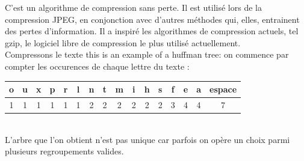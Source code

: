 \documentclass[a4paper,12pt,french]{book}
\begin{document}
	C'est un algorithme de compression sans perte. 
	Il est utilisé lors de la compression JPEG, en conjonction avec d'autres méthodes qui, elles, entrainent des pertes d'information.
	Il a inspiré les algorithmes de compression actuels, tel gzip, le logiciel libre de compression le plus utilisé actuellement.\\
	
	Compressons le texte \og this is an example of a huffman tree\fg : 
	on commence par compter les occurences de chaque lettre du texte :
	\begin{center}
	\begin{tabular}{|c|c|c|c|c|c|c|c|c|c|c|c|c|c|c|c|}
	\hline 
	o & u & x & p & r & l & n & t & m & i & h & s & f & e & a & espace \\ 
	\hline 
	1 & 1 & 1 & 1 & 1 & 1 & 2 & 2 & 2 & 2 & 2 & 2 & 3 & 4 & 4 & 7 \\ 
	\hline 
	\end{tabular}
	\end{center}
	
	
	 			
	 \ \\			
	 L'arbre que l'on obtient n'est pas unique car parfois on opère un choix parmi plusieurs regroupements valides.\\
	
\end{document}
